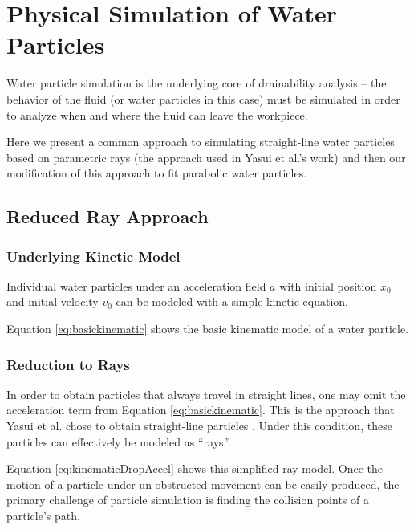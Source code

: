 						\chapter{Physical Simulation of Water Particles}\label{physicalChapter}

Water particle simulation is the underlying core of drainability analysis -- the behavior of the fluid (or water particles in this case) must be simulated in order to analyze when and where the fluid can leave the workpiece.

Here we present a common approach to simulating straight-line water particles based on parametric rays (the approach used in Yasui et al.'s work) and then our modification of this approach to fit parabolic water particles.

\section{Reduced Ray Approach}

	\subsection{Underlying Kinetic Model}

Individual water particles under an acceleration field $a$ with initial position $x_0$ and initial velocity $v_0$ can be modeled with a simple kinetic equation.


Equation \eqref{eq:basickinematic} shows the basic kinematic model of a water particle.


	\subsection{Reduction to Rays}

In order to obtain particles that always travel in straight lines, one may omit the acceleration term from Equation \eqref{eq:basickinematic}. This is the approach that Yasui et al. chose to obtain straight-line particles \cite{Yasui2011}. Under this condition, these particles can effectively be modeled as ``rays.''


Equation \eqref{eq:kinematicDropAccel} shows this simplified ray model. Once the motion of a particle under un-obstructed movement can be easily produced, the primary challenge of particle simulation is finding the collision points of a particle's path.

